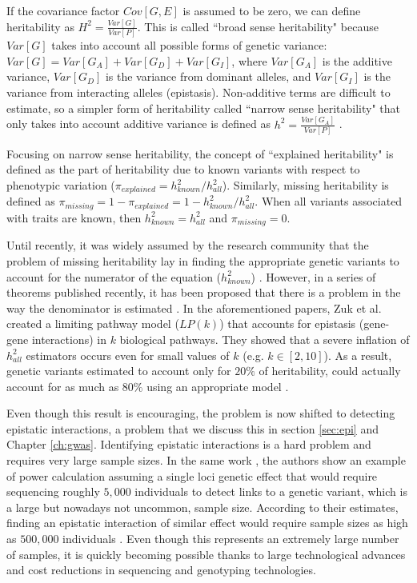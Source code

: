 If the covariance factor $Cov[G, E]$ is assumed to be zero, we can define heritability as $H^2 = \frac{Var[G] }{ Var[P]}$. 
This is called ``broad sense heritability" because $Var[G]$ takes into account all possible forms of genetic variance: $Var[G] = Var[G_A] + Var[G_D] + Var[G_I]$, where $Var[G_A]$ is the additive variance, $Var[G_D]$ is the variance from dominant alleles, and $Var[G_I]$ is the variance from interacting alleles (epistasis). 
Non-additive terms are difficult to estimate, so a simpler form of heritability called ``narrow sense heritability" that only takes into account additive variance is defined as $h^2 = \frac{ Var[G_A] }{ Var[P] }$ \cite{zuk2012mystery}.

Focusing on narrow sense heritability, the concept of ``explained heritability" is defined as the part of heritability due to known variants with respect to phenotypic variation ($\pi_{explained} = h^2_{known} / h^2_{all}$). 
Similarly, missing heritability is defined as $\pi_{missing} = 1 - \pi_{explained} = 1 - h^2_{known} / h^2_{all}$. 
When all variants associated with traits are known, then $h^2_{known} = h^2_{all}$ and $\pi_{missing} = 0$.

Until recently, it was widely assumed by the research community that the problem of missing heritability lay in finding the appropriate genetic variants to account for the numerator of the equation ($h^2_{known}$) \cite{zuk2012mystery}. 
However, in a series of theorems published recently, it has been proposed that there is a problem in the way the denominator is estimated \cite{zuk2012mystery}. 
In the aforementioned papers, Zuk et al. created a limiting pathway model ($LP(k)$) that accounts for epistasis (gene-gene interactions) in $k$ biological pathways. They showed that a severe inflation of $h^2_{all}$ estimators occurs even for small values of $k$ (e.g. $k \in [2,10]$). 
As a result, genetic variants estimated to account only for $20\%$ of heritability, could actually account for as much as $80\%$ using an appropriate model \cite{zuk2012mystery}.

Even though this result is encouraging, the problem is now shifted to detecting epistatic interactions, a problem that we discuss this in section \ref{sec:epi} and Chapter \ref{ch:gwas}.
Identifying epistatic interactions is a hard problem and requires very large sample sizes. 
In the same work \cite{zuk2012mystery}, the authors show an example of power calculation assuming a single loci genetic effect that would require sequencing roughly $5,000$ individuals to detect links to a genetic variant, which is a large but nowadays not uncommon, sample size. 
According to their estimates, finding an epistatic interaction of similar effect would require sample sizes as high as  $500,000$ individuals \cite{zuk2012mystery}.
Even though this represents an extremely large number of samples, it is quickly becoming possible thanks to large technological advances and cost reductions in sequencing and genotyping technologies.

